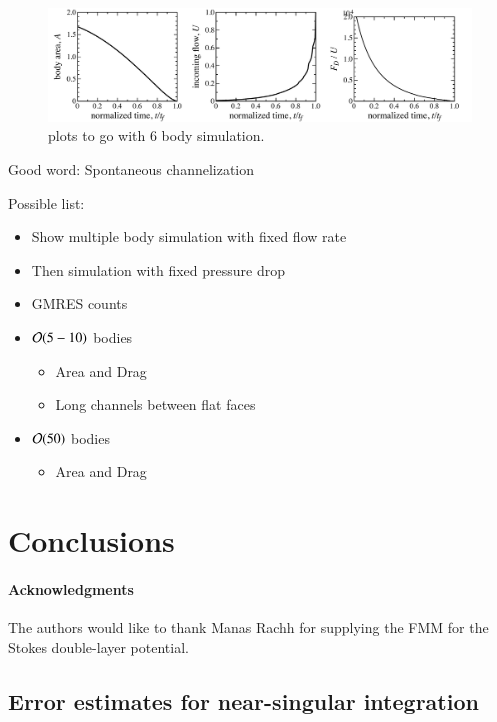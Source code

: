 \documentclass[preprint, 10pt]{elsarticle}
\begin{document}
\begin{figure}%
\begin{center}
\includegraphics[width = 0.99 \textwidth]{./figs/06plots.pdf}
\caption{\label{fig:06plots} plots to go with 6 body simulation.
}
\end{center}
\end{figure}



\newpage

Good word: Spontaneous channelization

Possible list:
\begin{itemize}
\item Show multiple body simulation with fixed flow rate
\item Then simulation with fixed pressure drop
\item GMRES counts
%
\item ${\mathcal{O}}(5-10)$ bodies
	\begin{itemize}
	\item Area and Drag
	\item Long channels between flat faces
	\end{itemize}
\item ${\mathcal{O}}(50)$ bodies
	\begin{itemize}
	\item Area and Drag
	\end{itemize}
\end{itemize}




\section{Conclusions\label{s:conclusions}}


\paragraph{\bf Acknowledgments} The authors would like to thank Manas
Rachh for supplying the FMM for the Stokes double-layer potential.


\begin{appendices}
\section{Error estimates for near-singular integration \label{A:AppendixA}} 
\end{appendices}


 

\end{document}
